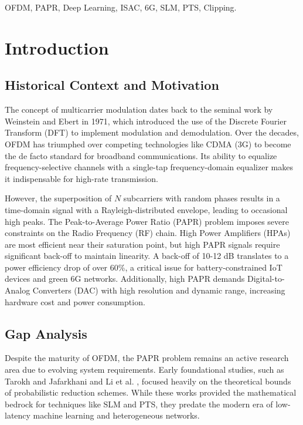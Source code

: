 \documentclass[conference]{IEEEtran}
\begin{document}
\begin{IEEEkeywords}
    OFDM, PAPR, Deep Learning, ISAC, 6G, SLM, PTS, Clipping.
\end{IEEEkeywords}

\section{Introduction}

\subsection{Historical Context and Motivation}
The concept of multicarrier modulation dates back to the seminal work by Weinstein and Ebert \cite{ref1} in 1971, which introduced the use of the Discrete Fourier Transform (DFT) to implement modulation and demodulation. Over the decades, OFDM has triumphed over competing technologies like CDMA (3G) to become the de facto standard for broadband communications. Its ability to equalize frequency-selective channels with a single-tap frequency-domain equalizer makes it indispensable for high-rate transmission.

However, the superposition of $N$ subcarriers with random phases results in a time-domain signal with a Rayleigh-distributed envelope, leading to occasional high peaks. The Peak-to-Average Power Ratio (PAPR) problem imposes severe constraints on the Radio Frequency (RF) chain. High Power Amplifiers (HPAs) are most efficient near their saturation point, but high PAPR signals require significant back-off to maintain linearity. A back-off of 10-12 dB translates to a power efficiency drop of over 60\%, a critical issue for battery-constrained IoT devices and green 6G networks. Additionally, high PAPR demands Digital-to-Analog Converters (DAC) with high resolution and dynamic range, increasing hardware cost and power consumption.

\subsection{Gap Analysis}
Despite the maturity of OFDM, the PAPR problem remains an active research area due to evolving system requirements. Early foundational studies, such as Tarokh and Jafarkhani \cite{ref2} and Li et al. \cite{ref3}, focused heavily on the theoretical bounds of probabilistic reduction schemes. While these works provided the mathematical bedrock for techniques like SLM and PTS, they predate the modern era of low-latency machine learning and heterogeneous networks.
\end{document}
